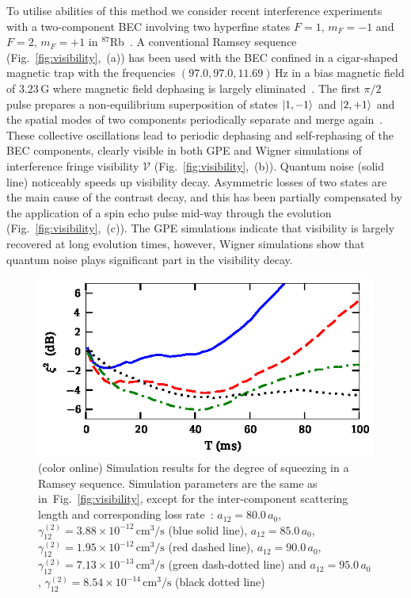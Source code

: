 \documentclass[aps,prl,twocolumn,showpacs,amsmath,amssymb,superscriptaddress,flushbottom,noraggedfooter]{revtex4-1}
\newcommand{\Rb}{$^{87}$Rb}
\newcommand{\figref}[1]{Fig.~\ref{#1}}
\newcommand{\ket}[1]{\mbox{\ensuremath{\vert #1 \rangle}}}
\begin{document}
To utilise abilities of this method we consider recent interference experiments
with a two-component BEC involving two hyperfine states
${F=1,\, m_{F}=-1}$ and ${F=2,\, m_{F}=+1}$ in \Rb~\cite{Egorov2010}.
A conventional Ramsey sequence (\figref{fig:visibility},~(a)) has been used
with the BEC confined in a cigar-shaped magnetic trap with the frequencies $(97.0, 97.0, 11.69)\,\mathrm{Hz}$
in a bias magnetic field of $3.23\,\mathrm{G}$ where magnetic field dephasing is largely eliminated~\cite{Hall1998}.
The first $\pi/2$ pulse prepares a non-equilibrium superposition of states ${\ket{1,-1}}$ and ${\ket{2,+1}}$
and the spatial modes of two components periodically separate and merge again~\cite{Mertes2007}.
These collective oscillations lead to periodic dephasing and self-rephasing of the BEC components,
clearly visible in both GPE and Wigner simulations of interference fringe visibility
$\mathcal{V}$ (\figref{fig:visibility},~(b)).
Quantum noise (solid line) noticeably speeds up visibility decay.
Asymmetric losses of two states are the main cause of the contrast decay,
and this has been partially compensated by the application of a spin echo pulse
mid-way through the evolution (\figref{fig:visibility},~(c)).
The GPE simulations indicate that visibility is largely recovered at long evolution times,
however, Wigner simulations show that quantum noise plays significant part in the visibility decay.

\begin{figure}
	\includegraphics{ramsey_squeezing.eps}

	\caption[]{(color online) Simulation results for the degree of squeezing in a Ramsey sequence.
	Simulation parameters are the same as in~\figref{fig:visibility},
	except for the inter-component scattering length and corresponding loss rate~\cite{Kaufman2009}:
	$a_{12} = 80.0\,a_0$, $\gamma^{(2)}_{12} = 3.88 \times 10^{-12}\,\mathrm{cm^3/s}$ (blue solid line),
	$a_{12} = 85.0\,a_0$, $\gamma^{(2)}_{12} = 1.95 \times 10^{-12}\,\mathrm{cm^3/s}$ (red dashed line),
	$a_{12} = 90.0\,a_0$, $\gamma^{(2)}_{12} = 7.13 \times 10^{-13}\,\mathrm{cm^3/s}$ (green dash-dotted line) and
	$a_{12} = 95.0\,a_0$, $\gamma^{(2)}_{12} = 8.54 \times 10^{-14}\,\mathrm{cm^3/s}$ (black dotted line)}

	\label{fig:squeezing}
\end{figure}
\end{document}
